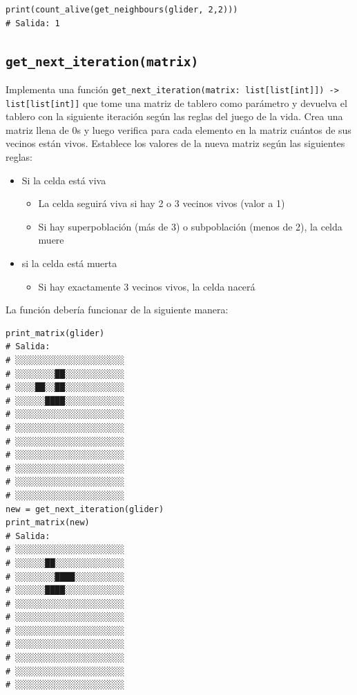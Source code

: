 \documentclass[10pt,a4paper]{article}
\begin{document}
\begin{lstlisting}
print(count_alive(get_neighbours(glider, 2,2)))
# Salida: 1
\end{lstlisting}

\subsection{\texttt{get\_next\_iteration(matrix)}}

Implementa una función \lstinline|get_next_iteration(matrix: list[list[int]]) -> list[list[int]]| que tome una matriz de tablero como parámetro y devuelva el tablero con la siguiente iteración según las reglas del juego de la vida. Crea una matriz llena de 0s y luego verifica para cada elemento en la matriz cuántos de sus vecinos están vivos. Establece los valores de la nueva matriz según las siguientes reglas:
\begin{itemize}
\item Si la celda está viva
    \begin{itemize}
    \item La celda seguirá viva si hay 2 o 3 vecinos vivos (valor a 1)
    \item Si hay superpoblación (más de 3) o subpoblación (menos de 2), la celda muere  
    \end{itemize}
\item si la celda está muerta
    \begin{itemize}
    \item Si hay exactamente 3 vecinos vivos, la celda nacerá
    \end{itemize}
\end{itemize}

La función debería funcionar de la siguiente manera:

\begin{lstlisting}
print_matrix(glider)
# Salida: 
# ░░░░░░░░░░░░░░░░░░░░░░
# ░░░░░░░░██░░░░░░░░░░░░
# ░░░░██░░██░░░░░░░░░░░░
# ░░░░░░████░░░░░░░░░░░░
# ░░░░░░░░░░░░░░░░░░░░░░
# ░░░░░░░░░░░░░░░░░░░░░░
# ░░░░░░░░░░░░░░░░░░░░░░
# ░░░░░░░░░░░░░░░░░░░░░░
# ░░░░░░░░░░░░░░░░░░░░░░
# ░░░░░░░░░░░░░░░░░░░░░░
# ░░░░░░░░░░░░░░░░░░░░░░
new = get_next_iteration(glider)
print_matrix(new)
# Salida:
# ░░░░░░░░░░░░░░░░░░░░░░
# ░░░░░░██░░░░░░░░░░░░░░
# ░░░░░░░░████░░░░░░░░░░
# ░░░░░░████░░░░░░░░░░░░
# ░░░░░░░░░░░░░░░░░░░░░░
# ░░░░░░░░░░░░░░░░░░░░░░
# ░░░░░░░░░░░░░░░░░░░░░░
# ░░░░░░░░░░░░░░░░░░░░░░
# ░░░░░░░░░░░░░░░░░░░░░░
# ░░░░░░░░░░░░░░░░░░░░░░
# ░░░░░░░░░░░░░░░░░░░░░░
\end{lstlisting}
\end{document}
